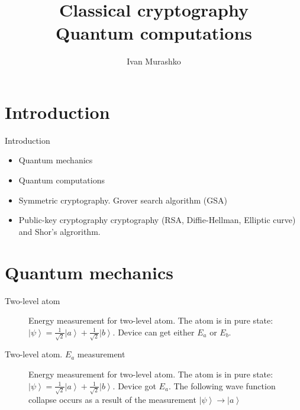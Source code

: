 \documentclass[10pt,pdf,hyperref={unicode}]{beamer}
\title[Cryptography and quantum computations]{Classical
  cryptography\\Quantum computations}
\author{Ivan Murashko}
\date{}
\begin{document}
\begin{frame}
\titlepage
\end{frame}


\section{Introduction}

\begin{frame}{Introduction}
\begin{itemize}
\item Quantum mechanics
\item Quantum computations
\item Symmetric cryptography. Grover search algorithm (GSA)
\item Public-key cryptography cryptography (RSA, Diffie-Hellman, Elliptic
curve) and Shor's algrorithm.
\end{itemize}
\end{frame}

\section{Quantum mechanics}
\begin{frame}{Two-level atom}
\begin{figure}
\centering



\caption{Energy measurement for two-level atom. The atom is in pure
  state:  $\left|\psi\right> = 
  \frac{1}{\sqrt{2}}\left|a\right> + \frac{1}{\sqrt{2}}\left|b\right>$.
  Device can get either $E_a$ or $E_b$.
}
\label{fig:add:mesure_ex}
\end{figure}
\end{frame}

\begin{frame}{Two-level atom. $E_a$ measurement}
\begin{figure}
\centering



\caption{Energy measurement for two-level atom. The atom is in pure
  state: $\left|\psi\right> = 
  \frac{1}{\sqrt{2}}\left|a\right> + \frac{1}{\sqrt{2}}\left|b\right>$.
  Device got $E_a$. The following wave function collapse occurs as a
  result of the measurement $\left|\psi\right> \to \left|a\right>$
}
\label{fig:add:mesure_ex_a}
\end{figure}
\end{frame}
\end{document}
